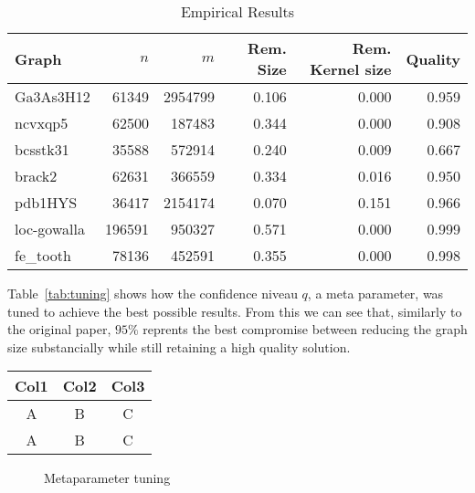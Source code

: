 \documentclass[acmsmall,nonacm,screen,review]{acmart}
\begin{document}
\begin{table}[ht]
\caption{Empirical Results}
\begin{tabular}{||l r r|r r r||}
  \hline 
  Graph & $n$ & $m$& Rem. Size & Rem. Kernel size & Quality \\

  \hline\hline
  Ga3As3H12 & 61349 & 2954799 & 0.106 & 0.000 & 0.959 \\
  ncvxqp5 & 62500 & 187483 & 0.344 & 0.000 & 0.908 \\
  bcsstk31 & 35588 & 572914 & 0.240 & 0.009 & 0.667 \\
  brack2 & 62631 & 366559 & 0.334 & 0.016 & 0.950 \\
  pdb1HYS & 36417 & 2154174 & 0.070 & 0.151 & 0.966 \\
  loc-gowalla & 196591 & 950327 & 0.571 & 0.000 & 0.999 \\
  fe\_tooth & 78136 & 452591 & 0.355 & 0.000 & 0.998 \\
  \hline

\end{tabular}
\end{table}\label{tab:perf}

Table~\ref{tab:tuning} shows how the confidence niveau $q$, a meta parameter, was tuned
to achieve the best possible results.
From this we can see that, similarly to the original paper,
$95\%$ reprents the best compromise between reducing the graph size substancially 
while still retaining a high quality solution.

\begin{table}[ht]
\begin{tabular}{||c c c||}
  \hline 
  Col1&Col2&Col3 \\
  \hline\hline
  A&B&C \\
  A&B&C \\
  \hline
\end{tabular}
\end{table}\label{tab:tuning}

\begin{figure}
\caption{Metaparameter tuning}
\begin{center}
  
\end{center}
\end{figure}
\end{document}
